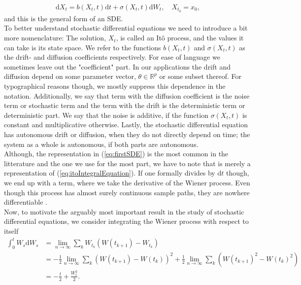 \begin{align}
    \mathrm{d}X_t = b(X_t, t)\mathrm{d}t + \sigma(X_t, t)\mathrm{d}W_t, \quad X_{t_0} = x_0 \label{eq:firstSDE},
\end{align}
and this is the general form of an SDE. \\
To better understand stochastic differential equations we need to introduce a bit more nomenclature: The solution, $X_t$, is called an Itô process, and the values it can take is its state space. We refer to the functions $b(X_t, t)$ and $\sigma(X_t, t)$ as the drift- and diffusion coefficients respectively. For ease of language we sometimes leave out the "coefficient" part. In our applications the drift and diffusion depend on some parameter vector, $\theta\in\mathbb{R}^p$ or some subset thereof. For typographical reasons though, we mostly suppress this dependence in the notation. Additionally, we say that term with the diffusion coefficient is the noise term or stochastic term and the term with the drift is the deterministic term or deterministic part. We say that the noise is additive, if the function $\sigma(X_t, t)$ is constant and multiplicative otherwise. Lastly, the stochastic differential equation has autonomous drift or diffusion, when they do not directly depend on time; the system as a whole is autonomous, if both parts are autonomous.\\
Although, the representation in (\ref{eq:firstSDE}) is the most common in the litterature and the one we use for the most part, we have to note that is merely a representation of (\ref{eq:itoIntegralEquation}). If one formally divides by $\mathrm{d}t$ though, we end up with a term, where we take the derivative of the Wiener process. Even though this process has almost surely continuous sample paths, they are nowhere differentiable \cite[theorem 11.22 and theorem 11.35]{Hansen2022}.\\
Now, to motivate the arguably most important result in the study of stochastic differential equations, we consider integrating the Wiener process with respect to itself
\begin{align}
    \int_0^t W_s \mathrm{d}W_s & = \lim_{n \to \infty}\sum_k W_{t_k}\left(W(t_{k + 1}) - W_{t_k}\right) \nonumber \\ 
    & = - \frac{1}{2}\lim_{n \to \infty}\sum_k \left(W(t_{k + 1}) - W(t_{k})\right)^2  + \frac{1}{2}\lim_{n \to \infty}\sum_k\left(W(t_{k + 1})^2 - W(t_{k})^2\right) \nonumber \\
    & = -\frac{t}{2} + \frac{W_t^2}{2}.
\end{align}
